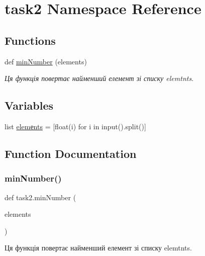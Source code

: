 \hypertarget{namespacetask2}{}\section{task2 Namespace Reference}
\label{namespacetask2}
\subsection*{Functions}
\begin{DoxyCompactItemize}
\item 
def \hyperlink{namespacetask2_a12aaca63885e3b703be969afcc35e353}{min\+Number} (elements)
\begin{DoxyCompactList}\small\item\em Ця функція повертає найменший елемент зі списку elemtnts. \end{DoxyCompactList}\end{DoxyCompactItemize}
\subsection*{Variables}
\begin{DoxyCompactItemize}
\item 
list \hyperlink{namespacetask2_a732f5a3629ece6b5f7c76c93c1676f01}{elemеnts} = \mbox{[}float(i) for i in input().split()\mbox{]}
\end{DoxyCompactItemize}


\subsection{Function Documentation}
\mbox{\label{namespacetask2_a12aaca63885e3b703be969afcc35e353}} 
\subsubsection{\texorpdfstring{min\+Number()}{minNumber()}}
{\footnotesize\ttfamily def task2.\+min\+Number (\begin{DoxyParamCaption}\item[{}]{elements }\end{DoxyParamCaption})}



Ця функція повертає найменший елемент зі списку elemtnts. 


